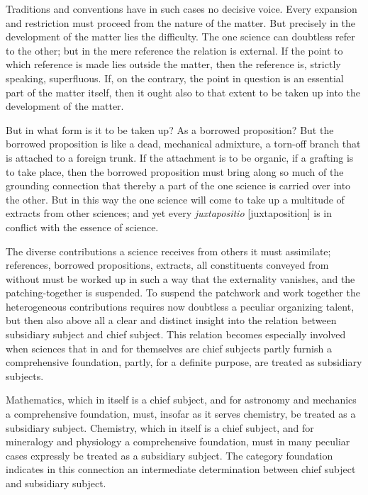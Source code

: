 \documentclass[12pt]{book}
\begin{document}
Traditions and conventions have in such cases no decisive voice. Every expansion and
restriction must proceed from the nature of the matter. But precisely in the development of
the matter lies the difficulty. The one science can doubtless refer to the other; but in the
mere reference the relation is external. If the point to which reference is made lies outside
the matter, then the reference is, strictly speaking, superfluous. If, on the contrary, the
point in question is an essential part of the matter itself, then it ought also to that
extent to be taken up into the development of the matter.

But in what form is it to be taken up? As a borrowed proposition? But the borrowed
proposition is like a dead, mechanical admixture, a torn-off branch that is attached to a
foreign trunk. If the attachment is to be organic, if a grafting is to take place, then the
borrowed proposition must bring along so much of the grounding connection that thereby a part
of the one science is carried over into the other. But in this way the one science will come
to take up a multitude of extracts from other sciences; and yet every \textit{juxtapositio}
[juxtaposition] is in conflict with the essence of science.

The diverse contributions a science receives from others it must assimilate; references,
borrowed propositions, extracts, all constituents conveyed from without must be worked up in
such a way that the externality vanishes, and the patching-together is suspended.
To suspend the patchwork and work together the heterogeneous contributions requires now
doubtless a peculiar organizing talent, but then also above all a clear and distinct insight
into the relation between subsidiary subject and chief subject. This relation becomes
especially involved when sciences that in and for themselves are chief subjects partly
furnish a comprehensive foundation, partly, for a definite purpose, are treated as subsidiary
subjects.

Mathematics, which in itself is a chief subject, and for astronomy and mechanics a
comprehensive foundation, must, insofar as it serves chemistry, be treated as a subsidiary
subject. Chemistry, which in itself is a chief subject, and for mineralogy and physiology a
comprehensive foundation, must in many peculiar cases expressly be treated as a subsidiary
subject. The category foundation indicates in this connection an intermediate determination
between chief subject and subsidiary subject.
\end{document}
